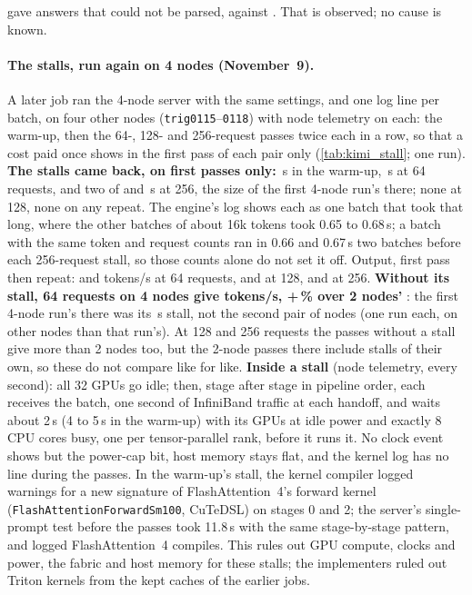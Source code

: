 gave \TriKimiFourMmluUnparsed{} answers that could not be parsed, against \TriKimiMmluUnparsed. That is observed; no cause is known.

\paragraph{The stalls, run again on 4 nodes (November~9).} A later job ran the 4-node server with the same settings, and one log line per batch, on four other nodes (\texttt{trig0115}--\texttt{0118}) with node telemetry on each: the warm-up, then the 64-, 128- and 256-request passes twice each in a row, so that a cost paid once shows in the first pass of each pair only (\cref{tab:kimi_stall}; one run). \textbf{The stalls came back, on first passes only:} \TriKstallWarmStall\,s in the warm-up, \TriKstallSixtyFourStall\,s at 64 requests, and two of \TriKstallTwoFiftySixStall{} and \TriKstallTwoFiftySixStallSecond\,s at 256, the size of the first 4-node run's there; none at 128, none on any repeat. The engine's log shows each as one batch that took that long, where the other batches of about 16k tokens took 0.65 to 0.68\,s; a batch with the same token and request counts ran in 0.66 and 0.67\,s two batches before each 256-request stall, so those counts alone do not set it off. Output, first pass then repeat: \TriKstallSixtyFourFirst{} and \TriKstallSixtyFourRepeat{} tokens/s at 64 requests, \TriKstallOneTwentyEightFirst{} and \TriKstallOneTwentyEightRepeat{} at 128, \TriKstallTwoFiftySixFirst{} and \TriKstallTwoFiftySixRepeat{} at 256. \textbf{Without its stall, 64 requests on 4 nodes give \TriKstallSixtyFourRepeat{} tokens/s, +\TriKstallSixtyFourPct\,\% over 2 nodes' \TriKimiSixtyFourTok}: the first 4-node run's \TriKimiFourSixtyFourTok{} there was its \TriKstallFourSixtyFourStall\,s stall, not the second pair of nodes (one run each, on other nodes than that run's). At 128 and 256 requests the passes without a stall give more than 2 nodes too, but the 2-node passes there include stalls of their own, so these do not compare like for like. \textbf{Inside a stall} (node telemetry, every second): all 32 GPUs go idle; then, stage after stage in pipeline order, each receives the batch, one second of InfiniBand traffic at each handoff, and waits about 2\,s (4 to 5\,s in the warm-up) with its GPUs at idle power and exactly 8 CPU cores busy, one per tensor-parallel rank, before it runs it. No clock event shows but the power-cap bit, host memory stays flat, and the kernel log has no line during the passes. In the warm-up's stall, the kernel compiler logged warnings for a new signature of FlashAttention~4's forward kernel (\texttt{FlashAttentionForwardSm100}, CuTeDSL) on stages 0 and 2; the server's single-prompt test before the passes took 11.8\,s with the same stage-by-stage pattern, and logged FlashAttention~4 compiles. This rules out GPU compute, clocks and power, the fabric and host memory for these stalls; the implementers ruled out Triton kernels from the kept caches of the earlier jobs.

